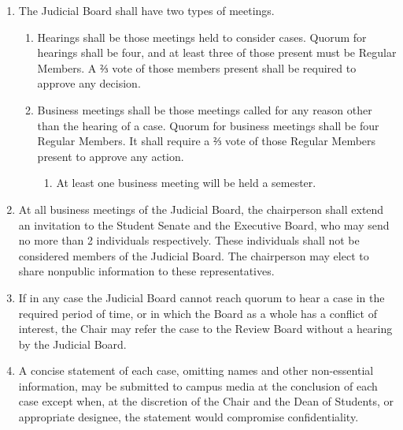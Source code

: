 
\begin{enumerate}
\item The Judicial Board shall have two types of meetings.
  \begin{enumerate}
  \item Hearings shall be those meetings held to consider cases. Quorum for hearings shall be four, and at least three of those present must be Regular Members. A ⅔ vote of those members present shall be required to approve any decision.
  \item Business meetings shall be those meetings called for any reason other than the hearing of a case. Quorum for business meetings shall be four Regular Members. It shall require a ⅔ vote of those Regular Members present to approve any action.
    \begin{enumerate}
    \item At least one business meeting will be held a semester.
    \end{enumerate}
  \end{enumerate}
\item At all business meetings of the Judicial Board, the chairperson shall extend an invitation to the Student Senate and the Executive Board, who may send no more than 2 individuals respectively. These individuals shall not be considered members of the Judicial Board. The chairperson may elect to share nonpublic information to these representatives.
\item If in any case the Judicial Board cannot reach quorum to hear a case in the required period of time, or in which the Board as a whole has a conflict of interest, the Chair may refer the case to the Review Board without a hearing by the Judicial Board.
\item A concise statement of each case, omitting names and other non-essential information, may be submitted to campus media at the conclusion of each case except when, at the discretion of the Chair and the Dean of Students, or appropriate designee, the statement would compromise confidentiality.
\end{enumerate}



